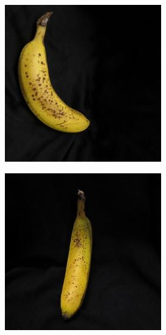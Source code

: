 \documentclass{article} %
\begin{document}
\begin{figure}[h]
\begin{subfigure}{.123\textwidth}
\captionsetup{labelformat=empty}
\caption{}
\end{subfigure}%
  \begin{subfigure}{.123\textwidth}
  \centering
\includegraphics[width=\textwidth]{../results/q_samples/mis_pre/RIPE_1_PRE_3.jpg}
\captionsetup{labelformat=empty}
\caption{}
\end{subfigure}%
  \begin{subfigure}{.123\textwidth}
  \centering
\includegraphics[width=\textwidth]{../results/q_samples/mis_pre/RIPE_1_PRE_4.jpg}

\end{subfigure}
\end{figure}
\end{document}
